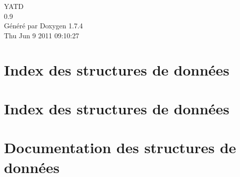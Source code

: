 \documentclass[a4paper]{book}
\begin{document}
\hypersetup{pageanchor=false}
\begin{titlepage}
\vspace*{7cm}
\begin{center}
{\Large YATD \\[1ex]\large 0.9 }\\
\vspace*{1cm}
{\large Généré par Doxygen 1.7.4}\\
\vspace*{0.5cm}
{\small Thu Jun 9 2011 09:10:27}\\
\end{center}
\end{titlepage}
\clearemptydoublepage
{}
\tableofcontents
\clearemptydoublepage
{}
\hypersetup{pageanchor=true}
\chapter{Index des structures de données}

\chapter{Index des structures de données}

\chapter{Documentation des structures de données}














\printindex
\end{document}
